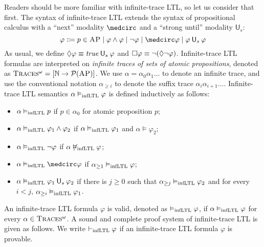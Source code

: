 \documentclass{amsart}
\begin{document}
Readers should be more familiar with infinite-trace LTL, 
so let us consider that first.
The syntax of infinite-trace LTL 
extends the syntax of propositional calculus
with a ``next'' modality $\wnext$ 
and a ``strong until'' modality $\mathsf{U}_s$:
$$
\varphi \Coloneqq p \in \AP
\mid \varphi \wedge \varphi
\mid \neg \varphi
\mid \wnext \varphi
\mid \varphi \Us \varphi
$$
As usual,
we define ${\lozenge} \varphi \equiv \mathit{true} \mathbin{\mathsf{U}_s} \varphi$
and ${\square} \varphi \equiv \neg ({\lozenge} \neg \varphi)$.
Infinite-trace LTL formulas are interpreted on 
\emph{infinite traces of sets of atomic propositions},
denoted as $\textsc{Traces$^\omega$} = [ \mathbb{N} \to \mathcal{P}(\textsc{AP})]$.
We use $\alpha = \alpha_0\alpha_1\dots$
to denote an infinite trace,
and use the conventional notation
$\alpha_{\ge i}$ to denote the suffix trace
$\alpha_i \alpha_{i+1} \dots$.
Infinite-trace LTL semantics $\alpha \vDash_{\mathrm{infLTL}} \varphi$ is defined 
inductively as follows:
\begin{itemize}
	\item $\alpha \vDash_{\mathrm{infLTL}} p$ if $p \in \alpha_0$ for atomic proposition $p$;
	\item $\alpha \vDash_{\mathrm{infLTL}} \varphi_1 \wedge \varphi_2$
	if $\alpha \vDash_{\mathrm{infLTL}} \varphi_1$ and $\alpha \vDash \varphi_2$;
	\item $\alpha \vDash_{\mathrm{infLTL}} \neg \varphi$
	if $\alpha \not\vDash_{\mathrm{infLTL}} \varphi$;
	\item $\alpha  \vDash_\infLTL \wnext \varphi$
	if $\alpha_{\ge 1} \vDash_{\mathrm{infLTL}} \varphi$;
	\item $\alpha \vDash_{\mathrm{infLTL}} \varphi_1 \mathbin{\mathsf{U}_s} \varphi_2$
	if there is $j \ge 0$ such that
	$\alpha_{\ge j} \vDash_{\mathrm{infLTL}} \varphi_2$ and for every $i < j$,
	$\alpha_{\ge i} \vDash_{\mathrm{infLTL}} \varphi_1$.
\end{itemize}
An infinite-trace LTL formula $\varphi$ is valid,
denoted as $\vDash_{\mathrm{infLTL}} \varphi$,
if $\alpha \vDash_{\mathrm{infLTL}} \varphi$ 
for every $\alpha \in \textsc{Traces$^\omega$}$.
A sound and complete proof system of infinite-trace LTL
is given as follows.
We write $\vdash_{\mathrm{infLTL}} \varphi$
if an infinite-trace LTL formula $\varphi$ is provable.
\end{document}

